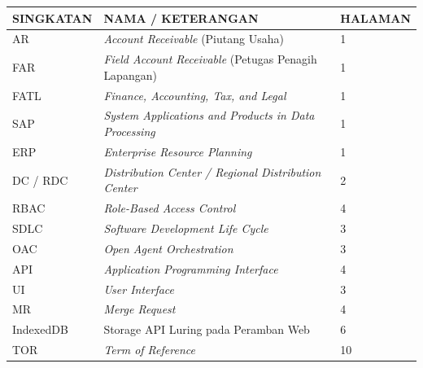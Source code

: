 
\begin{center}
\begin{longtable}{p{2.8cm}p{9.2cm}p{2.5cm}}
\textbf{SINGKATAN} & \textbf{NAMA / KETERANGAN} & \textbf{HALAMAN} \\
\hline
\endhead
AR & \textit{Account Receivable} (Piutang Usaha) & 1 \\
FAR & \textit{Field Account Receivable} (Petugas Penagih Lapangan) & 1 \\
FATL & \textit{Finance, Accounting, Tax, and Legal} & 1 \\
SAP & \textit{System Applications and Products in Data Processing} & 1 \\
ERP & \textit{Enterprise Resource Planning} & 1 \\
DC / RDC & \textit{Distribution Center / Regional Distribution Center} & 2 \\
RBAC & \textit{Role-Based Access Control} & 4 \\
SDLC & \textit{Software Development Life Cycle} & 3 \\
OAC & \textit{Open Agent Orchestration} & 3 \\
API & \textit{Application Programming Interface} & 4 \\
UI & \textit{User Interface} & 3 \\
MR & \textit{Merge Request} & 4 \\
IndexedDB & Storage API Luring pada Peramban Web & 6 \\
TOR & \textit{Term of Reference} & 10 \\
\hline
\end{longtable}
\end{center}
